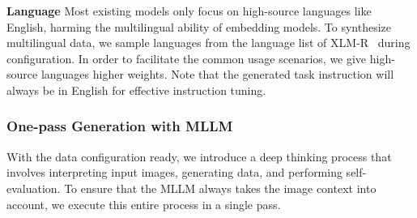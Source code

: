 \noindent \textbf{Language}
Most existing models only focus on high-source languages like English, harming the multilingual ability of embedding models.
To synthesize multilingual data, we sample languages from the language list of XLM-R~\cite{XLM-R} during configuration.
In order to facilitate the common usage scenarios, we give high-source languages higher weights.
Note that the generated task instruction will always be in English for effective instruction tuning.

\subsubsection{One-pass Generation with MLLM}

With the data configuration ready, we introduce a deep thinking process that involves interpreting input images, generating data, and performing self-evaluation.
To ensure that the MLLM always takes the image context into account, we execute this entire process in a single pass.

